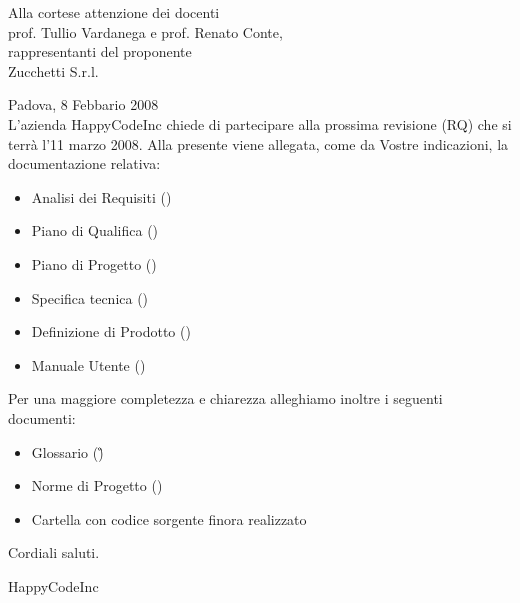 


\newcommand{\dt}{ Lettera di accompagnamento }%




\thispagestyle{plain}
\begin{flushright}
Alla cortese attenzione dei docenti\\
prof. Tullio Vardanega e prof. Renato Conte,\\
rappresentanti del proponente\\
Zucchetti S.r.l.
\end{flushright}
Padova, 8 Febbario 2008 \\

L'azienda HappyCodeInc chiede di partecipare alla prossima revisione (RQ) che si terr\`a l'11 marzo 2008.
Alla presente viene allegata, come da Vostre indicazioni, la documentazione relativa:
\begin{itemize}
\item{}Analisi dei Requisiti (\AR)
\item{}Piano di Qualifica (\PdQ)
\item{}Piano di Progetto (\PdP)
\item{}Specifica tecnica (\ST) 
\item{}Definizione di Prodotto (\DdP)
\item{}Manuale Utente (\MU)
\end{itemize}
Per una maggiore completezza e chiarezza alleghiamo inoltre i seguenti documenti:
\begin{itemize}
\item{}Glossario (\G)
\item{}Norme di Progetto (\NdP)
\item{}Cartella con codice sorgente finora realizzato
\end{itemize}
Cordiali saluti.
\begin{flushright}
HappyCodeInc
\end{flushright}
\newpage


